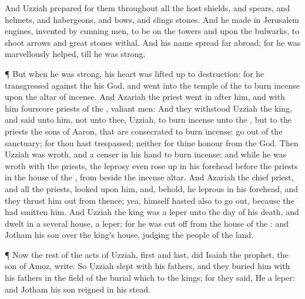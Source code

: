 {And
Uzziah
prepared for them throughout all the
host
shields, and
spears, and
helmets, and
habergeons, and
bows, and
slings
{}
stones.
And he
made in
Jerusalem
engines,
invented by cunning
men, to be on the
towers and upon the
bulwarks, to
shoot
arrows and
great
stones withal. And his
name
spread far
abroad; for he was
marvellously
helped,
till he was
strong.
\par }{\PP {}¶ But when he was
strong, his
heart was lifted
up to
{}
destruction: for he
transgressed against the
{} his
God, and
went into the
temple of the
{} to burn
incense upon the
altar of
incense.
And
Azariah the
priest went
in
after him, and with him
fourscore
priests of the
{},
{}
valiant
men:
And they
withstood
Uzziah the
king, and
said unto him,
{} not unto thee,
Uzziah, to burn
incense unto the
{}, but to the
priests the
sons of
Aaron, that are
consecrated to burn
incense: go
out of the
sanctuary; for thou hast
trespassed; neither
{} for thine
honour from the
{}
God.
Then
Uzziah was
wroth, and
{} a
censer in his
hand to burn
incense: and while he was
wroth with the
priests, the
leprosy even rose
up in his
forehead
before the
priests in the
house of the
{}, from beside the
incense
altar.
And
Azariah the
chief
priest, and all the
priests,
looked upon him, and, behold, he
{}
leprous in his
forehead, and they thrust him
out from thence; yea, himself
hasted also to go
out, because the
{} had
smitten him.
And
Uzziah the
king was a
leper unto the
day of his
death, and dwelt
in a
several
house,
{} a
leper; for he was cut
off from the
house of the
{}: and
Jotham his
son
{} over the
king’s
house,
judging the
people of the
land.
\par }{\PP {}¶ Now the
rest of the
acts of
Uzziah,
first and
last, did
Isaiah the
prophet, the
son of
Amoz,
write.
So
Uzziah
slept with his
fathers, and they
buried him with his
fathers in the
field of the
burial which
{} to the
kings; for they
said, He
{} a
leper: and
Jotham his
son
reigned in his stead.

}
